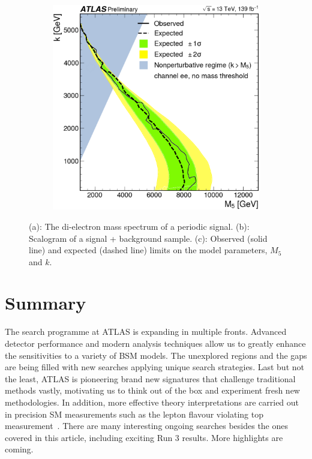 \documentclass{moriond}
\begin{document}
\begin{figure}[htp]
\begin{subfigure}[b]{0.25\textwidth}
         \caption{}
         \label{fig:shape}
     \end{subfigure}
     \begin{subfigure}[b]{0.25\textwidth}
         \centering
         \includegraphics[width=\textwidth]{periodic}
         \caption{}
         \label{fig:perlimits}
     \end{subfigure}
        \caption{(a): The di-electron mass spectrum of a periodic signal. (b): Scalogram of a signal + background sample. (c): Observed (solid line) and expected (dashed line) limits on the model parameters, $M_{5}$ and $k$\protect\cite{period}.}
        \label{fig:periodic}
\end{figure}

\section{Summary}

The search programme at ATLAS is expanding in multiple fronts. Advanced detector
performance and modern analysis techniques allow us to greatly enhance the
sensitivities to a variety of BSM models. The unexplored regions and the gaps
are being filled with new searches applying unique search strategies. Last but
not the least, ATLAS is pioneering brand new signatures that challenge
traditional methods vastly, motivating us to think out of the box and experiment
fresh new methodologies. In addition, more effective theory interpretations are
carried out in precision SM measurements such as the lepton flavour violating
top measurement~\cite{top}. There are many interesting ongoing searches besides
the ones covered in this article, including exciting Run 3 results. More
highlights are coming.       
\end{document}
